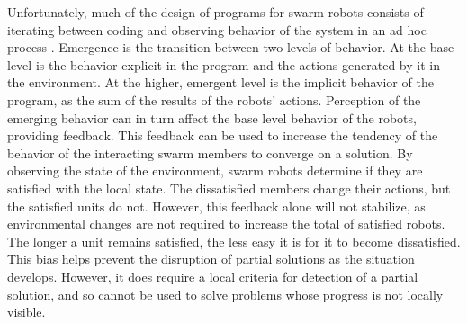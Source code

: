 \documentclass[]{article}
\begin{document}
Unfortunately, much of the design of programs for swarm robots consists of iterating between coding and observing behavior of the system in an ad hoc process \cite{palmer2005behavioral}. 
Emergence is the transition between two levels of behavior. 
At the base level is the behavior explicit in the program and the actions generated by it in the environment. 
At the higher, emergent level is the implicit behavior of the program, as the sum of the results of the robots' actions. 
Perception of the emerging behavior can in turn affect the base level behavior of the robots, providing feedback. 
This feedback can be used to increase the tendency of the behavior of the interacting swarm members to converge on a solution. 
By observing the state of the environment, swarm robots determine if they are satisfied with the local state. 
The dissatisfied members change their actions, but the satisfied units do not. 
However, this feedback alone will not stabilize, as environmental changes are not required to increase the total of satisfied robots. 
The longer a unit remains satisfied, the less easy it is for it to become dissatisfied. 
This bias helps prevent the disruption of partial solutions as the situation develops. 
However, it does require a local criteria for detection of a partial solution, and so cannot be used to solve problems whose progress is not locally visible. 
\end{document}
